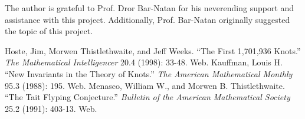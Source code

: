 \begin{paper}


The author is grateful to Prof. Dror Bar-Natan for his neverending support and
assistance with this project.
Additionally, Prof. Bar-Natan originally suggested the topic of this project.


\begin{thebibliography}{}
Hoste, Jim, Morwen Thistlethwaite, and Jeff Weeks.
``The First 1,701,936 Knots.''
\textit{The Mathematical Intelligencer}
20.4 (1998): 33-48. Web.
Kauffman, Louis H.
``New Invariants in the Theory of Knots.''
\textit{The American Mathematical Monthly}
95.3 (1988): 195. Web.
Menasco, William W., and Morwen B. Thistlethwaite.
``The Tait Flyping Conjecture.''
\textit{Bulletin of the American Mathematical Society}
25.2 (1991): 403-13. Web.
\end{thebibliography}

\end{paper}


